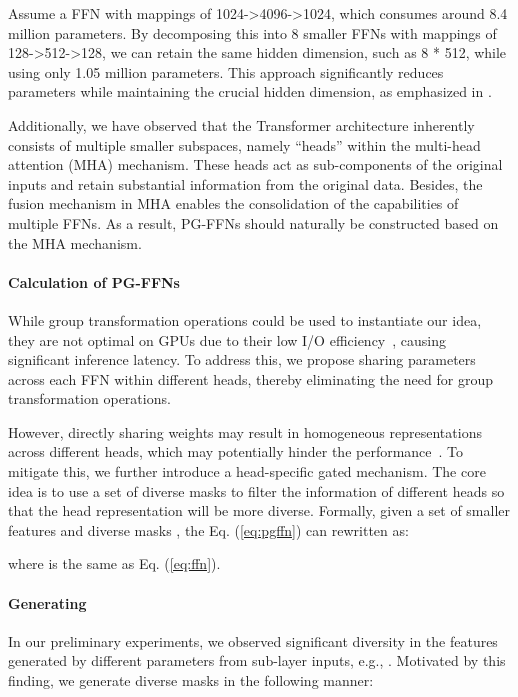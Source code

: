 \documentclass[11pt]{article}
\begin{document}
Assume a FFN with mappings of 1024->4096->1024, which consumes around 8.4 million parameters. By decomposing this into 8 smaller FFNs with mappings of 128->512->128, we can retain the same hidden dimension, such as 8 * 512, while using only 1.05 million parameters. This approach significantly reduces parameters while maintaining the crucial hidden dimension, as emphasized in \citet{geva-etal-2021-transformer, tran-etal-2021-facebook}.


Additionally, we have observed that the Transformer architecture inherently consists of multiple smaller subspaces, namely ``heads'' within the multi-head attention (MHA) mechanism. These heads act as sub-components of the original inputs and retain substantial information from the original data. Besides, the fusion mechanism in MHA enables the consolidation of the capabilities of multiple FFNs. As a result, PG-FFNs should naturally be constructed based on the MHA mechanism.


\paragraph{Calculation of PG-FFNs}
While group transformation operations could be used to instantiate our idea, they are not optimal on GPUs due to their low I/O efficiency~\cite{Ningning2018shufflenetv2}, causing significant inference latency. To address this, we propose sharing parameters across each FFN within different heads, thereby eliminating the need for group transformation operations.


However, directly sharing weights may result in homogeneous representations across different heads, which may potentially hinder the performance~\cite{li-etal-2018-multi-head}.  To mitigate this, we further introduce a head-specific gated mechanism. The core idea is to use a set of diverse masks to filter the information of different heads so that the head representation will be more diverse. Formally, given a set of smaller features  and diverse masks , the Eq. (\ref{eq:pgffn}) can rewritten as: 
\noindent

\noindent
\noindent where   is the same as Eq. (\ref{eq:ffn}). 


\paragraph{Generating } 
In our preliminary experiments, we observed significant diversity in the features generated by different parameters from sub-layer inputs, e.g., . Motivated by this finding, we generate diverse masks in the following manner:
\end{document}
